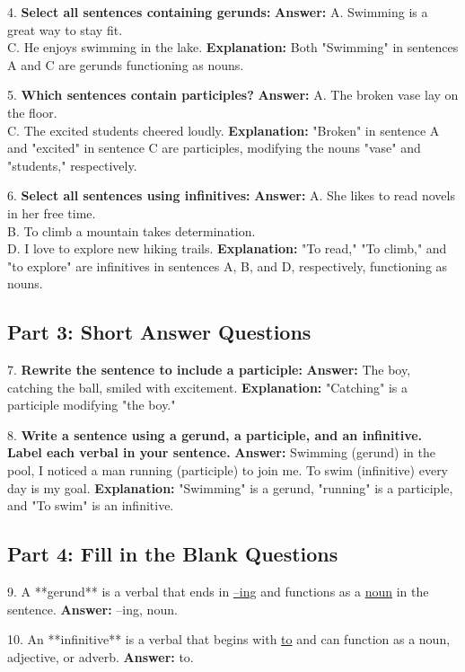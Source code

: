 \documentclass[12pt]{article}
\begin{document}
4. \textbf{Select all sentences containing gerunds:}  
\textbf{Answer:} A. Swimming is a great way to stay fit. \\
C. He enjoys swimming in the lake.  
\textbf{Explanation:} Both "Swimming" in sentences A and C are gerunds functioning as nouns.

\vspace{1cm}
5. \textbf{Which sentences contain participles?}  
\textbf{Answer:} A. The broken vase lay on the floor. \\
C. The excited students cheered loudly.  
\textbf{Explanation:} "Broken" in sentence A and "excited" in sentence C are participles, modifying the nouns "vase" and "students," respectively.

\vspace{1cm}
6. \textbf{Select all sentences using infinitives:}  
\textbf{Answer:} A. She likes to read novels in her free time. \\
B. To climb a mountain takes determination. \\
D. I love to explore new hiking trails.  
\textbf{Explanation:} "To read," "To climb," and "to explore" are infinitives in sentences A, B, and D, respectively, functioning as nouns.

\subsection*{Part 3: Short Answer Questions}

7. \textbf{Rewrite the sentence to include a participle:}  
\textbf{Answer:} The boy, catching the ball, smiled with excitement.  
\textbf{Explanation:} "Catching" is a participle modifying "the boy."

\vspace{1cm}
8. \textbf{Write a sentence using a gerund, a participle, and an infinitive. Label each verbal in your sentence.}  
\textbf{Answer:} Swimming (gerund) in the pool, I noticed a man running (participle) to join me. To swim (infinitive) every day is my goal.  
\textbf{Explanation:} "Swimming" is a gerund, "running" is a participle, and "To swim" is an infinitive.

\subsection*{Part 4: Fill in the Blank Questions}

9. A **gerund** is a verbal that ends in \underline{–ing} and functions as a \underline{noun} in the sentence.  
\textbf{Answer:} –ing, noun.

10. An **infinitive** is a verbal that begins with \underline{to} and can function as a noun, adjective, or adverb.  
\textbf{Answer:} to.
\end{document}
